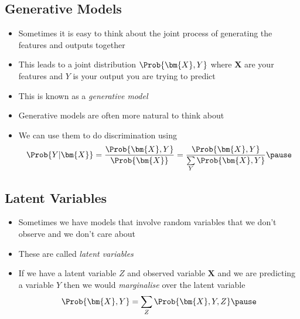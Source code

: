 
\begin{slide}
\section{Generative Models}

\begin{PauseHighLight}
  \begin{itemize}
  \item Sometimes it is easy to think about the joint process of
    generating the features and outputs together\pause
  \item This leads to a joint distribution $\Prob{\bm{X},Y}$ where
    $\bm{X}$ are your features and $Y$ is your output you are trying to
    predict\pause
  \item This is known as a \emph{generative model}\pause
  \item Generative models are often more natural to think about\pause
  \item We can use them to do discrimination using
    \begin{align*}
      \Prob{Y|\bm{X}} = \frac{\Prob{\bm{X},Y}}{\Prob{\bm{X}}}
      = \frac{\Prob{\bm{X},Y}}{\sum\limits_Y \Prob{\bm{X}, Y}}\pause
    \end{align*}
  \end{itemize}
\end{PauseHighLight}

\end{slide}


\begin{slide}
\section{Latent Variables}

\begin{PauseHighLight}
  \begin{itemize}
  \item Sometimes we have models that involve random variables that we
    don't observe and we don't care about\pause
  \item These are called \emph{latent variables}\pause
  \item If we have a latent variable $Z$ and observed variable $\bm{X}$
    and we are predicting a variable $Y$ then we would
    \emph{marginalise} over the latent variable
    \begin{align*}
      \Prob{\bm{X}, Y} = \sum_Z \Prob{\bm{X}, Y, Z}\pause
    \end{align*}
  \end{itemize}
\end{PauseHighLight}

\end{slide}

